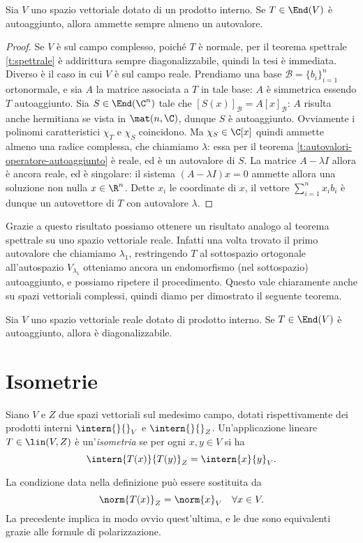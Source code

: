 \begin{teorema}
	Sia $V$ uno spazio vettoriale dotato di un prodotto interno.
	Se $T\in\End(V)$ è autoaggiunto, allora ammette sempre almeno un autovalore.
\end{teorema}
\begin{proof}
	Se $V$ è sul campo complesso, poich\'e $T$ è normale, per il teorema spettrale \ref{t:spettrale} è addirittura sempre diagonalizzabile, quindi la tesi è immediata.
	Diverso è il caso in cui $V$ è sul campo reale.
	Prendiamo una base $\mathcal B=\{b_i\}_{i=1}^n$ ortonormale, e sia $A$ la matrice associata a $T$ in tale base: $A$ è simmetrica essendo $T$ autoaggiunto.
	Sia $S\in\End(\C^n)$ tale che $[S(x)]_\mathcal{B}=A[x]_\mathcal{B}$: $A$ risulta anche hermitiana se vista in $\mat(n,\C)$, dunque $S$ è autoaggiunto.
	Ovviamente i polinomi caratteristici $\chi_T$ e $\chi_S$ coincidono.
	Ma $\chi_S\in\C[x]$ quindi ammette almeno una radice complessa, che chiamiamo $\lambda$: essa per il teorema \ref{t:autovalori-operatore-autoaggiunto} è reale, ed è un autovalore di $S$.
	La matrice $A-\lambda I$ allora è ancora reale, ed è singolare: il sistema $(A-\lambda I)x=0$ ammette allora una soluzione non nulla $x\in\R^n$.
	Dette $x_i$ le coordinate di $x$, il vettore $\sum_{i=1}^nx_ib_i$ è dunque un autovettore di $T$ con autovalore $\lambda$.
\end{proof}
Grazie a questo risultato possiamo ottenere un risultato analogo al teorema spettrale su uno spazio vettoriale reale.
Infatti una volta trovato il primo autovalore che chiamiamo $\lambda_1$, restringendo $T$ al sottospazio ortogonale all'autospazio $V_{\lambda_1}$ otteniamo ancora un endomorfismo (nel sottospazio) autoaggiunto, e possiamo ripetere il procedimento.
Questo vale chiaramente anche su spazi vettoriali complessi, quindi diamo per dimostrato il seguente teorema.
\begin{teorema}
	Sia $V$ uno spazio vettoriale reale dotato di prodotto interno.
	Se $T\in\End(V)$ è autoaggiunto, allora è diagonalizzabile.
\end{teorema}

\section{Isometrie} \label{sec:isometrie}
\begin{definizione} \label{d:isometria}
	Siano $V$ e $Z$ due spazi vettoriali sul medesimo campo, dotati rispettivamente dei prodotti interni $\intern{}{}_V$ e $\intern{}{}_Z$.
	Un'applicazione lineare $T\in\lin(V,Z)$ è un'\emph{isometria} se per ogni $  x,  y\in V$ si ha
	\begin{equation*}
		\intern{T(  x)}{T(  y)}_Z=\intern{  x}{  y}_V.
	\end{equation*}
\end{definizione}
La condizione data nella definizione può essere sostituita da
\begin{equation}
	\norm{T(x)}_Z=\norm{x}_V\quad\forall x\in V.
\end{equation}
La precedente implica in modo ovvio quest'ultima, e le due sono equivalenti grazie alle formule di polarizzazione.

